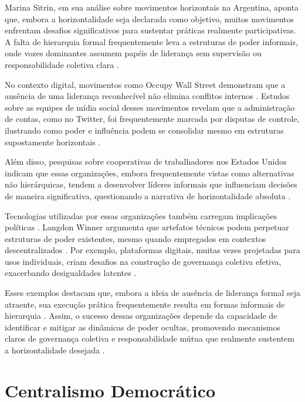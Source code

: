 Marina Sitrin, em sua análise sobre movimentos horizontais na Argentina,
aponta que, embora a horizontalidade seja declarada como objetivo, muitos
movimentos enfrentam desafios significativos para sustentar práticas
realmente participativas. A falta de hierarquia formal frequentemente leva
a estruturas de poder informais, onde vozes dominantes assumem papéis de
liderança sem supervisão ou responsabilidade coletiva clara
\cite{EverydayRevolutions}.

No contexto digital, movimentos como Occupy Wall Street demonstram que a
ausência de uma liderança reconhecível não elimina conflitos internos
\cite{SocialMediaTeamsAsDigitalVanguards}.
Estudos sobre as equipes de mídia social desses movimentos revelam que a
administração de contas, como no Twitter, foi frequentemente marcada por
disputas de controle, ilustrando como poder e influência podem se
consolidar mesmo em estruturas supostamente horizontais
\cite{SocialMediaTeamsAsDigitalVanguards}.

Além disso, pesquisas sobre cooperativas de trabalhadores nos Estados
Unidos indicam que essas organizações, embora frequentemente vistas como
alternativas não hierárquicas, tendem a desenvolver líderes informais que
influenciam decisões de maneira significativa, questionando a narrativa de
horizontalidade absoluta \cite{WorkerCooperativesandRevolution}.

Tecnologias utilizadas por essas organizações também carregam implicações
políticas \cite{DoArtifactsHavePolitics, Democraciaeoscodigosinvisiveis}.
Langdon Winner argumenta que artefatos técnicos podem perpetuar estruturas de poder
existentes, mesmo quando empregados em contextos
descentralizados \cite{DoArtifactsHavePolitics}. Por exemplo, plataformas digitais,
muitas vezes projetadas para usos individuais, criam desafios na construção de
governança coletiva efetiva, exacerbando desigualdades latentes
\cite{DoArtifactsHavePolitics, BigTech}.

Esses exemplos destacam que, embora a ideia de ausência de liderança formal
seja atraente, sua execução prática frequentemente resulta em formas
informais de hierarquia \cite{EverydayRevolutions, SocialMediaTeamsAsDigitalVanguards}.
Assim, o sucesso dessas organizações depende da
capacidade de identificar e mitigar as dinâmicas de poder ocultas,
promovendo mecanismos claros de governança coletiva e responsabilidade
mútua que realmente sustentem a horizontalidade desejada \cite{Colbac}.

\section{Centralismo Democrático}
\label{sec:centralismo_democratico}

